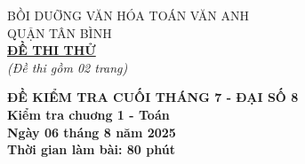 \documentclass[12pt]{article}
\begin{document}
\begin{center}
    \begin{minipage}[t]{0.45\textwidth}
        \centering
        BỒI DUỠNG VĂN HÓA TOÁN VĂN ANH \\
        QUẬN TÂN BÌNH \\
        \textbf{\underline{ĐỀ THI THỬ}} \\
        \textit{(Đề thi gồm 02 trang)}
    \end{minipage}
    \begin{minipage}[t]{0.46\textwidth}
        \centering
        \textbf{ĐỀ KIỂM TRA CUỐI THÁNG 7 - ĐẠI SỐ 8}\\
        \textbf{Kiểm tra chuơng 1 - Toán} \\
        \textbf{Ngày 06 tháng 8 năm 2025} \\
        \textbf{Thời gian làm bài: 80 phút} \\
    \end{minipage}
\end{center}
\bigskip
\end{document}
